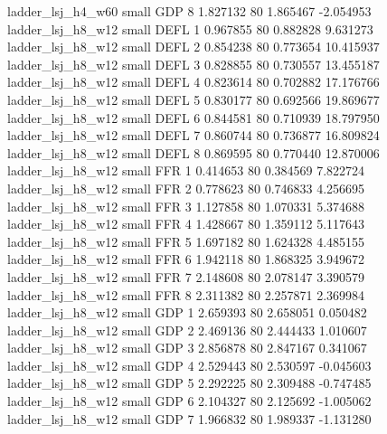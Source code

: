        ladder_lsj_h4_w60      small      GDP                 8 1.827132 80       1.865467          -2.054953
       ladder_lsj_h8_w12      small     DEFL                 1 0.967855 80       0.882828           9.631273
       ladder_lsj_h8_w12      small     DEFL                 2 0.854238 80       0.773654          10.415937
       ladder_lsj_h8_w12      small     DEFL                 3 0.828855 80       0.730557          13.455187
       ladder_lsj_h8_w12      small     DEFL                 4 0.823614 80       0.702882          17.176766
       ladder_lsj_h8_w12      small     DEFL                 5 0.830177 80       0.692566          19.869677
       ladder_lsj_h8_w12      small     DEFL                 6 0.844581 80       0.710939          18.797950
       ladder_lsj_h8_w12      small     DEFL                 7 0.860744 80       0.736877          16.809824
       ladder_lsj_h8_w12      small     DEFL                 8 0.869595 80       0.770440          12.870006
       ladder_lsj_h8_w12      small      FFR                 1 0.414653 80       0.384569           7.822724
       ladder_lsj_h8_w12      small      FFR                 2 0.778623 80       0.746833           4.256695
       ladder_lsj_h8_w12      small      FFR                 3 1.127858 80       1.070331           5.374688
       ladder_lsj_h8_w12      small      FFR                 4 1.428667 80       1.359112           5.117643
       ladder_lsj_h8_w12      small      FFR                 5 1.697182 80       1.624328           4.485155
       ladder_lsj_h8_w12      small      FFR                 6 1.942118 80       1.868325           3.949672
       ladder_lsj_h8_w12      small      FFR                 7 2.148608 80       2.078147           3.390579
       ladder_lsj_h8_w12      small      FFR                 8 2.311382 80       2.257871           2.369984
       ladder_lsj_h8_w12      small      GDP                 1 2.659393 80       2.658051           0.050482
       ladder_lsj_h8_w12      small      GDP                 2 2.469136 80       2.444433           1.010607
       ladder_lsj_h8_w12      small      GDP                 3 2.856878 80       2.847167           0.341067
       ladder_lsj_h8_w12      small      GDP                 4 2.529443 80       2.530597          -0.045603
       ladder_lsj_h8_w12      small      GDP                 5 2.292225 80       2.309488          -0.747485
       ladder_lsj_h8_w12      small      GDP                 6 2.104327 80       2.125692          -1.005062
       ladder_lsj_h8_w12      small      GDP                 7 1.966832 80       1.989337          -1.131280
